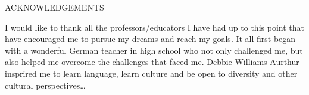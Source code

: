 

\begin{center}
\MakeUppercase{Acknowledgements}\\ \bigskip
\end{center}

I would like to thank all the professors/educators I have had up to this point that have encouraged me to pursue my dreams and reach my goals. It all first began with a wonderful German teacher in high school who not only challenged me, but also helped me overcome the challenges that faced me. Debbie Williams-Aurthur insprired me to learn language, learn culture and be open to diversity and other cultural perspectives\ldots
